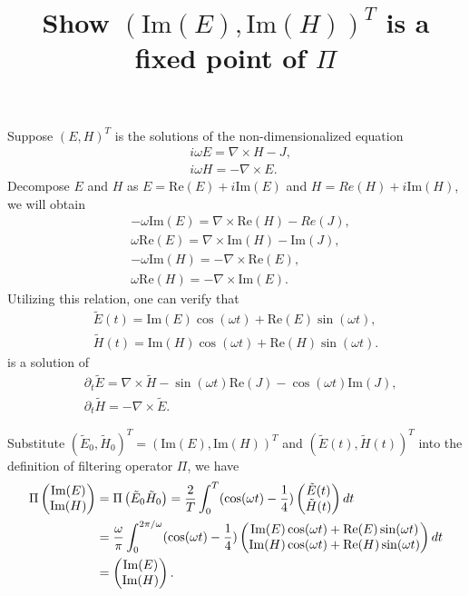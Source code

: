\documentclass[10pt]{article}
\begin{document}
\title{Show $(\textrm{Im}(E),\textrm{Im}(H))^T$ is a fixed point of $\Pi$}
\maketitle
Suppose $(E,H)^T$ is the solutions of the non-dimensionalized equation
\begin{align}
&i\omega E = \nabla\times H-J,\\
&i\omega H = -\nabla\times E.
\end{align}
Decompose $E$ and $H$ as $E=\textrm{Re}(E)+i \textrm{Im}(E)$ and $H=Re(H)+i \textrm{Im}(H)$, we will obtain 
\begin{align}
&-\omega \textrm{Im}(E) = \nabla\times \textrm{Re}(H)-Re(J), \\
& \omega \textrm{Re}(E) = \nabla\times \textrm{Im}(H)-\textrm{Im}(J), \\
&-\omega \textrm{Im}(H) = -\nabla\times \textrm{Re}(E), \\
&\omega  \textrm{Re}(H) = -\nabla\times \textrm{Im}(E). 
\end{align}
Utilizing this relation, one can verify that 
\begin{align}
\tilde{E}(t) = \textrm{Im}(E) \cos(\omega t) + \textrm{Re}(E) \sin(\omega t), \\
\tilde{H}(t) = \textrm{Im}(H) \cos (\omega t) + \textrm{Re}(H) \sin (\omega t).
\end{align}
is a solution of
\begin{align}
&\partial_t \tilde{E} =  \nabla\times \tilde{H}- \sin(\omega t)\textrm{Re}(J)-\cos(\omega t) \textrm{Im}(J),\\
&\partial_t \tilde{H} = -\nabla\times \tilde{E}.
\end{align}


Substitute $( \tilde{E}_0,\tilde{H}_0)^T=(\textrm{Im}(E),\textrm{Im}(H))^T$ and $( \tilde{E}(t),\tilde{H}(t) )^T$ into the definition of filtering operator $\Pi$, we have
\begin{align}
\Pi \left(\begin{matrix}
\textrm{Im}(E)\\
\textrm{Im}(H)
\end{matrix}\right)&=
\Pi \left(\begin{matrix}
\tilde{E}_0
\tilde{H}_0
\end{matrix}\right)
=  \frac{2}{T}\int_{0}^T 
(\cos(\omega t)-\frac{1}{4})
\left(\begin{matrix}
\tilde{E}(t)\\
\tilde{H}(t)
\end{matrix}\right)dt\notag\\
	&=\frac{\omega}{\pi}\int_{0}^{2\pi/\omega} 
(\cos(\omega t)-\frac{1}{4})
\left(\begin{matrix}
\textrm{Im}(E) \cos(\omega t) + \textrm{Re}(E) \sin(\omega t)\\
\textrm{Im}(H) \cos (\omega t) + \textrm{Re}(H) \sin (\omega t)
\end{matrix}\right)dt\notag\\
&=\left(\begin{matrix}
\textrm{Im}(E)\\
\textrm{Im}(H)
\end{matrix}\right).
\end{align}
\end{document}

